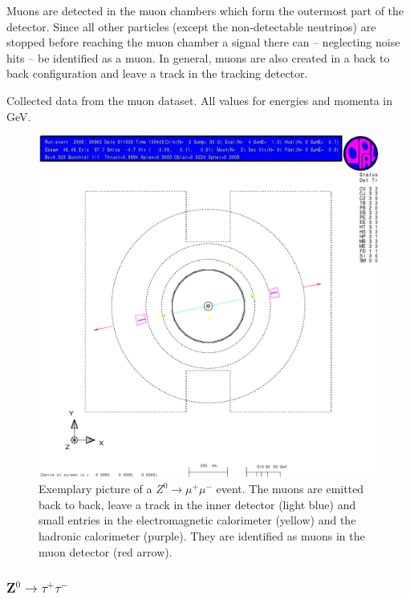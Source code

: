 \documentclass[11pt, a4paper]{article}
\numberwithin{equation}{section}
\begin{document}
Muons are detected in the muon chambers which form the outermost part of the detector.
Since all other particles (except the non-detectable neutrinos) are stopped before reaching the muon chamber a signal there can -- neglecting noise hits -- be identified as a muon. 
In general, muons are also created in a back to back configuration and leave a track in the tracking detector.
\begin{table}
	\centering
	
	\caption{Collected data from the muon dataset. All values for energies and momenta in \si{GeV}.}
\end{table}
\begin{figure}[h]
	\centering
	\includegraphics[width=\textwidth]{./data/tag1/mm_pics/cropped/mm_02}
	\caption{Exemplary picture of a $Z^0\rightarrow \mu^+\mu^-$ event. The muons are emitted back to back, leave a track in the inner detector (light blue) and small entries in the electromagnetic calorimeter (yellow) and the hadronic calorimeter (purple). They are identified as muons in the muon detector (red arrow).}
\end{figure}
\clearpage
\subsubsection{Z$^0\rightarrow \tau^+\tau^-$}
\end{document}
